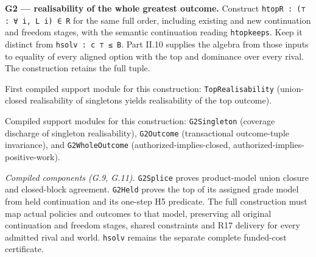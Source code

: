 \documentclass[
]{article}
\begin{document}
\textbf{G2 --- realisability of the whole greatest outcome.} Construct
\texttt{h\allowbreak{}t\allowbreak{}o\allowbreak{}p\allowbreak{}R\allowbreak{} \allowbreak{}:\allowbreak{} \allowbreak{}(\allowbreak{}⊤\allowbreak{} \allowbreak{}:\allowbreak{} \allowbreak{}∀\allowbreak{} \allowbreak{}i\allowbreak{},\allowbreak{} \allowbreak{}L\allowbreak{} \allowbreak{}i\allowbreak{})\allowbreak{} \allowbreak{}∈\allowbreak{} \allowbreak{}R}
for the same full order, including existing and new continuation and
freedom stages, with the semantic continuation reading
\texttt{htopkeeps}. Keep it distinct from \texttt{hsolv\ :\ c\ ⊤\ ≤\ B}.
Part II.10 supplies the algebra from those inputs to equality of every
aligned option with the top and dominance over every rival. The
construction retains the full tuple.

First compiled support module for this construction:
\texttt{TopRealisability} (union-closed realisability of singletons
yields realisability of the top outcome).

Compiled support modules for this construction: \texttt{G2Singleton}
(coverage discharge of singleton realisability), \texttt{G2Outcome}
(transactional outcome-tuple invariance), and \texttt{G2WholeOutcome}
(authorized-implies-closed, authorized-implies-positive-work).

\emph{Compiled components (G.9, G.11).} \texttt{G2Splice} proves
product-model union closure and closed-block agreement. \texttt{G2Held}
proves the top of its assigned grade model from held continuation and
its one-step H5 predicate. The full construction must map actual
policies and outcomes to that model, preserving all original
continuation and freedom stages, shared constraints and R17 delivery for
every admitted rival and world. \texttt{hsolv} remains the separate
complete funded-cost certificate.
\end{document}
